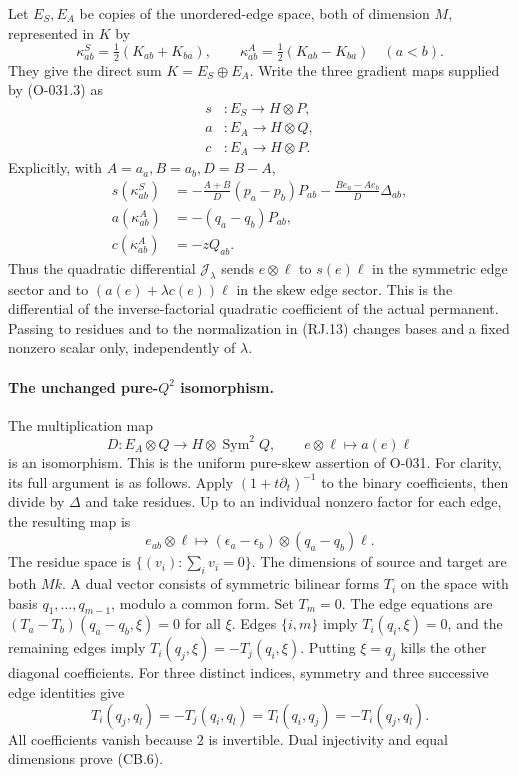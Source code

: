 Let \(E_S,E_A\) be copies of the unordered-edge space, both
of dimension \(M\), represented in \(K\) by
\[
 \kappa^S_{ab}=\tfrac12(K_{ab}+K_{ba}),\qquad
 \kappa^A_{ab}=\tfrac12(K_{ab}-K_{ba})\quad(a<b).
                                                               \tag{CB.3}
\]
They give the direct sum \(K=E_S\oplus E_A\).
Write the three gradient maps supplied by (O-031.3) as
\[
 \begin{aligned}
 s&:E_S\longrightarrow H\otimes P,\\
 a&:E_A\longrightarrow H\otimes Q,\\
 c&:E_A\longrightarrow H\otimes P.
 \end{aligned}                                                   \tag{CB.4}
\]
Explicitly, with \(A=a_a,B=a_b,D=B-A\),
\[
 \begin{aligned}
 s(\kappa^S_{ab})
   &=-\frac{A+B}{D}(p_a-p_b)P_{ab}
           -\frac{B e_a-A e_b}{D}\Delta_{ab},\\
 a(\kappa^A_{ab})&=-(q_a-q_b)P_{ab},\\
 c(\kappa^A_{ab})&=-zQ_{ab}.
 \end{aligned}                                                   \tag{CB.5}
\]
Thus the quadratic differential \(\mathcal J_\lambda\) sends
\(e\otimes\ell\) to \(s(e)\ell\) in the symmetric edge sector
and to \((a(e)+\lambda c(e))\ell\) in the skew edge sector.
This is the differential of the inverse-factorial quadratic
coefficient of the actual permanent. Passing to residues and
to the normalization in (RJ.13) changes bases and a fixed
nonzero scalar only, independently of \(\lambda\).

\paragraph{The unchanged pure-\(Q^2\) isomorphism.}
The multiplication map
\[
 D:E_A\otimes Q\longrightarrow H\otimes\operatorname{Sym}^2Q,
                         \qquad e\otimes\ell\longmapsto a(e)\ell
                                                               \tag{CB.6}
\]
is an isomorphism. This is the uniform pure-skew assertion of
O-031. For clarity, its full argument is as follows.
Apply \((1+t\partial_t)^{-1}\) to the binary coefficients,
then divide by \(\Delta\) and take residues. Up to an individual
nonzero factor for each edge, the resulting map is
\[
 e_{ab}\otimes\ell\longmapsto
              (\epsilon_a-\epsilon_b)\otimes(q_a-q_b)\ell.
                                                               \tag{CB.7}
\]
The residue space is \(\{(v_i):\sum_i v_i=0\}\).
The dimensions of source and target are both \(Mk\).
A dual vector consists of symmetric bilinear forms \(T_i\)
on the space with basis \(q_1,\ldots,q_{m-1}\), modulo a common
form. Set \(T_m=0\). The edge equations are
\((T_a-T_b)(q_a-q_b,\xi)=0\) for all \(\xi\).
Edges \(\{i,m\}\) imply \(T_i(q_i,\xi)=0\), and the remaining
edges imply \(T_i(q_j,\xi)=-T_j(q_i,\xi)\).
Putting \(\xi=q_j\) kills the other diagonal coefficients.
For three distinct indices, symmetry and three successive
edge identities give
\[
 T_i(q_j,q_l)=-T_j(q_i,q_l)
             =T_l(q_i,q_j)=-T_i(q_j,q_l).
\]
All coefficients vanish because \(2\) is invertible. Dual
injectivity and equal dimensions prove (CB.6).

